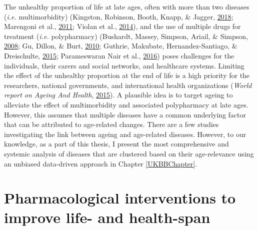 \documentclass[12pt,twoside]{unicam}
\begin{document}
The unhealthy proportion of life at late ages, often with more than two diseases (\emph{i.e.} multimorbidity) (Kingston, Robinson, Booth, Knapp, \& Jagger, \protect\hyperlink{ref-Kingston2018}{2018}; Marengoni et al., \protect\hyperlink{ref-Marengoni2011}{2011}; Violan et al., \protect\hyperlink{ref-Violan2014}{2014}), and the use of multiple drugs for treatment (\emph{i.e.} polypharmacy) (Bushardt, Massey, Simpson, Ariail, \& Simpson, \protect\hyperlink{ref-Bushardt2008}{2008}; Gu, Dillon, \& Burt, \protect\hyperlink{ref-Gu2010}{2010}; Guthrie, Makubate, Hernandez-Santiago, \& Dreischulte, \protect\hyperlink{ref-Guthrie2015}{2015}; Parameswaran Nair et al., \protect\hyperlink{ref-ParameswaranNair2016}{2016}) poses challenges for the individuals, their carers and social networks, and healthcare systems. Limiting the effect of the unhealthy proportion at the end of life is a high priority for the researchers, national governments, and international health organizations (\emph{World report on Ageing And Health}, \protect\hyperlink{ref-WHO2015}{2015}). A plausible idea is to target ageing to alleviate the effect of multimorbidity and associated polypharmacy at late ages. However, this assumes that multiple diseases have a common underlying factor that can be attributed to age-related changes. There are a few studies investigating the link between ageing and age-related diseases. However, to our knowledge, as a part of this thesis, I present the most comprehensive and systemic analysis of diseases that are clustered based on their age-relevance using an unbiased data-driven approach in Chapter \ref{UKBBChapter}.

\hypertarget{introInterventions}{%
\section{Pharmacological interventions to improve life- and health-span}\label{introInterventions}}
\end{document}
